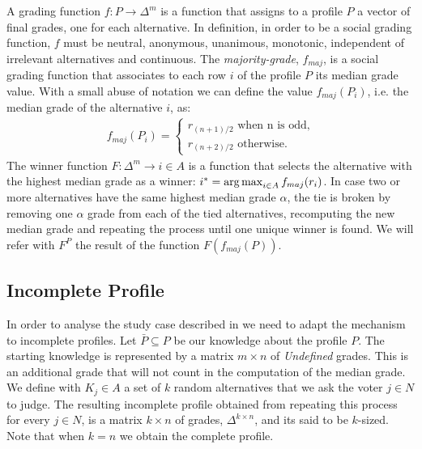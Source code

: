 \documentclass[version=3.21, pagesize, twoside=off, bibliography=totoc, DIV=calc, fontsize=12pt, a4paper]{scrartcl}
\begin{document}
A grading function $f: P \rightarrow \Delta^m$ is a function that assigns to a profile $P$ a vector of final grades, one for each alternative. In \citet{Balinski2007} definition, in order to be a social grading function, $f$ must be neutral, anonymous, unanimous, monotonic, independent of irrelevant alternatives and continuous. 
The \emph{majority-grade}, $f_{maj}$, is a social grading function that associates to each row $i$ of the profile $P$ its median grade value. With a small abuse of notation we can define the value $f_{maj}(P_i)$, i.e. the median grade of the alternative $i$, as:
\begin{align}
	f_{maj}(P_i) = \begin{cases}
		r_{(n+1)/2} \text{ when n is odd,} \\
		r_{(n+2)/2} \text{ otherwise.}
	\end{cases}
\end{align}
The winner function $F:\Delta^{m} \rightarrow i\in A$ is a function that selects the alternative with the highest median grade as a winner: $i^* = \operatorname*{arg\,max}_{i\in A}f_{maj}(r_i)$. In case two or more alternatives have the same highest median grade $\alpha$, the tie is broken by removing one $\alpha$ grade from each of the tied alternatives, recomputing the new median grade and repeating the process until one unique winner is found. We will refer with $F^P$ the result of the function $F(f_{maj}(P))$.

\subsection{Incomplete Profile}
In order to analyse the study case described in  we need to adapt the mechanism to incomplete profiles. Let $\bar{P} \subseteq P$ be our knowledge about the profile $P$. %
The starting knowledge is represented by a matrix $m\times n$ of \textit{Undefined} grades. This is an additional grade that will not count in the computation of the median grade. We define with $K_j \in A$ a set of $k$ random alternatives that we ask the voter $j\in N$ to judge. The resulting incomplete profile obtained from repeating this process for every $j \in N$, is a matrix $k \times n$ of grades, $\Delta^{k\times n}$, and its said to be $k$-sized. Note that when $k=n$ we obtain the complete profile.
\end{document}
